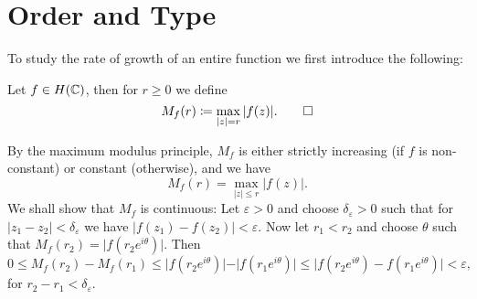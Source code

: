 \section{Order and Type} \label{sec:growth}

To study the rate of growth of an entire function we first introduce the following:
\begin{definition}
    Let $f \in H(\mathbb{C})$, then for $r \geq 0$ we define
    \begin{equation*}
        M_f(r) \coloneqq \max_{\vert z \vert = r} \vert f(z) \vert. \qedhere
    \end{equation*}
\end{definition}

\begin{remark}    
    By the maximum modulus principle, $M_f$ is either strictly increasing (if $f$ is non-constant) or constant (otherwise), and we have
    $$ M_f(r) = \max_{\vert z \vert \leq r} \vert f(z) \vert. $$
    We shall show that $M_f$ is continuous: Let $\varepsilon > 0$ and choose $\delta_\varepsilon > 0$ such that for ${\vert z_1 - z_2 \vert < \delta_\varepsilon}$ we have ${\vert f(z_1) - f(z_2) \vert < \varepsilon}$. Now let $r_1 < r_2$ and choose $\theta$ such that $M_f(r_2) = \vert f(r_2 e^{i \theta}) \vert$. Then
    \begin{equation*}
        0 \leq M_f(r_2) - M_f(r_1) \leq \vert f(r_2 e^{i \theta}) \vert - \vert f(r_1 e^{i \theta}) \vert \leq \vert f(r_2 e^{i \theta}) - f(r_1 e^{i \theta}) \vert < \varepsilon,
    \end{equation*}
    for $r_2 - r_1 < \delta_\varepsilon$.
\end{remark}



